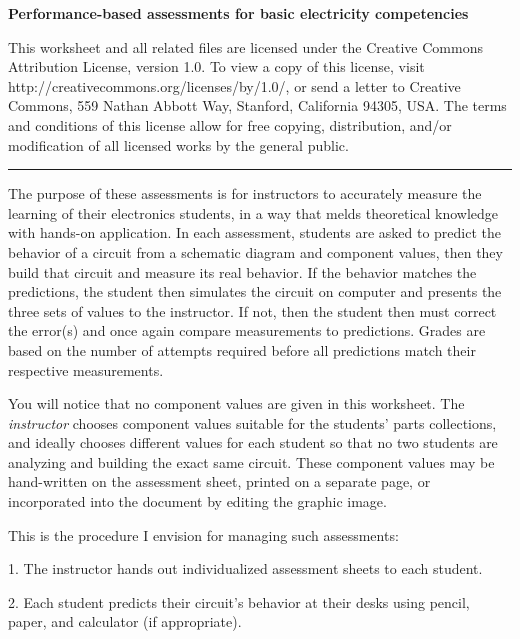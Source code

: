 
\centerline{\bf Performance-based assessments for basic electricity competencies} \bigskip 
 
This worksheet and all related files are licensed under the Creative Commons Attribution License, version 1.0.  To view a copy of this license, visit http://creativecommons.org/licenses/by/1.0/, or send a letter to Creative Commons, 559 Nathan Abbott Way, Stanford, California 94305, USA.  The terms and conditions of this license allow for free copying, distribution, and/or modification of all licensed works by the general public.

\bigskip 

\hrule

\vskip 10pt

The purpose of these assessments is for instructors to accurately measure the learning of their electronics students, in a way that melds theoretical knowledge with hands-on application.  In each assessment, students are asked to predict the behavior of a circuit from a schematic diagram and component values, then they build that circuit and measure its real behavior.  If the behavior matches the predictions, the student then simulates the circuit on computer and presents the three sets of values to the instructor.  If not, then the student then must correct the error(s) and once again compare measurements to predictions.  Grades are based on the number of attempts required before all predictions match their respective measurements.

You will notice that no component values are given in this worksheet.  The {\it instructor} chooses component values suitable for the students' parts collections, and ideally chooses different values for each student so that no two students are analyzing and building the exact same circuit.  These component values may be hand-written on the assessment sheet, printed on a separate page, or incorporated into the document by editing the graphic image.

\vskip 10pt

\noindent
This is the procedure I envision for managing such assessments:

\vskip 10pt

\item{1.} The instructor hands out individualized assessment sheets to each student.

\item{2.} Each student predicts their circuit's behavior at their desks using pencil, paper, and calculator (if appropriate).

